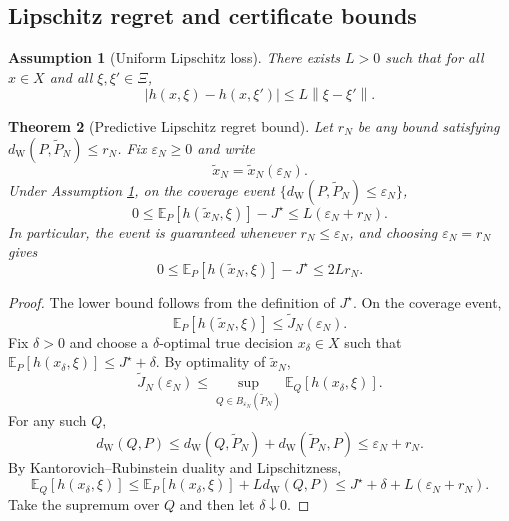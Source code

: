 \documentclass[11pt]{article}
\newtheorem{theorem}{Theorem}[section]
\newtheorem{assumption}[theorem]{Assumption}
\newcommand{\E}{\mathbb{E}}
\newcommand{\XiSet}{\Xi}
\newcommand{\1}{\mathbf{1}}
\newcommand{\dW}{d_{\mathrm W}}
\newcommand{\Ptil}{\widetilde P_N}
\newcommand{\norm}[1]{\left\lVert #1\right\rVert}
\begin{document}
\subsection{Lipschitz regret and certificate bounds}

\begin{assumption}[Uniform Lipschitz loss]\label{ass:lipschitz}
There exists $L>0$ such that for all $x\in X$ and all $\xi,\xi'\in\XiSet$,
\begin{equation}
    |h(x,\xi)-h(x,\xi')|\le L\norm{\xi-\xi'}.
\end{equation}
\end{assumption}

\begin{theorem}[Predictive Lipschitz regret bound]\label{thm:pred-regret}
Let $r_N$ be any bound satisfying $\dW(P,\Ptil)\le r_N$.  Fix $\varepsilon_N\ge0$ and write
\[
    \widetilde x_N=\widetilde x_N(\varepsilon_N).
\]
Under Assumption \ref{ass:lipschitz}, on the coverage event $\{\dW(P,\Ptil)\le\varepsilon_N\}$,
\begin{equation}\label{eq:general-regret-pred}
    0\le \E_P[h(\widetilde x_N,\xi)]-J^\star
    \le L(\varepsilon_N+r_N).
\end{equation}
In particular, the event is guaranteed whenever $r_N\le\varepsilon_N$, and choosing $\varepsilon_N=r_N$ gives
\begin{equation}\label{eq:2L-regret-pred}
    0\le \E_P[h(\widetilde x_N,\xi)]-J^\star\le2Lr_N.
\end{equation}
\end{theorem}

\begin{proof}
The lower bound follows from the definition of $J^\star$. On the coverage event,
\begin{equation}
    \E_P[h(\widetilde x_N,\xi)]\le \widetilde J_N(\varepsilon_N).
\end{equation}
Fix $\delta>0$ and choose a $\delta$-optimal true decision $x_\delta\in X$ such that $\E_P[h(x_\delta,\xi)]\le J^\star+\delta$. By optimality of $\widetilde x_N$,
\begin{equation}
    \widetilde J_N(\varepsilon_N)
    \le \sup_{Q\in B_{\varepsilon_N}(\Ptil)}\E_Q[h(x_\delta,\xi)].
\end{equation}
For any such $Q$,
\begin{equation}
    \dW(Q,P)\le \dW(Q,\Ptil)+\dW(\Ptil,P)
    \le\varepsilon_N+r_N.
\end{equation}
By Kantorovich--Rubinstein duality and Lipschitzness,
\begin{equation}
    \E_Q[h(x_\delta,\xi)]\le\E_P[h(x_\delta,\xi)]+L\dW(Q,P)
    \le J^\star+\delta+L(\varepsilon_N+r_N).
\end{equation}
Take the supremum over $Q$ and then let $\delta\downarrow0$.
\end{proof}
\end{document}
